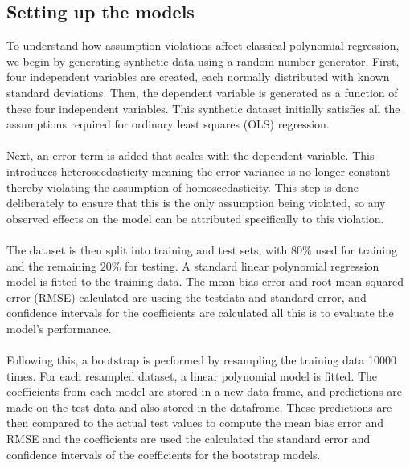 


\subsection{Setting up the models}
To understand how assumption violations affect classical polynomial regression, we begin by generating synthetic data using a random number generator. First, four independent variables are created, each normally distributed with known standard deviations. Then, the dependent variable is generated as a function of these four independent variables. This synthetic dataset initially satisfies all the assumptions required for ordinary least squares (OLS) regression.
\\\\
Next, an error term is added that scales with the dependent variable. This introduces heteroscedasticity meaning the error variance is no longer constant thereby violating the assumption of homoscedasticity. This step is done deliberately to ensure that this is the only assumption being violated, so any observed effects on the model can be attributed specifically to this violation.
\\\\
The dataset is then split into training and test sets, with $80\%$ used for training and the remaining $20\%$ for testing. A standard linear polynomial regression model is fitted to the training data. The mean bias error and root mean squared error (RMSE) calculated are useing the testdata and standard error, and confidence intervals for the coefficients are calculated all this is to evaluate the model's performance.
\\\\
Following this, a bootstrap is performed by resampling the training data 10000 times. For each resampled dataset, a linear polynomial model is fitted. The coefficients from each model are stored in a new data frame, and predictions are made on the test data and also stored in the dataframe. These predictions are then compared to the actual test values to compute the mean bias error and RMSE and the coefficients are used the calculated the standard error and confidence intervals of the coefficients for the bootstrap models.
\\\\

